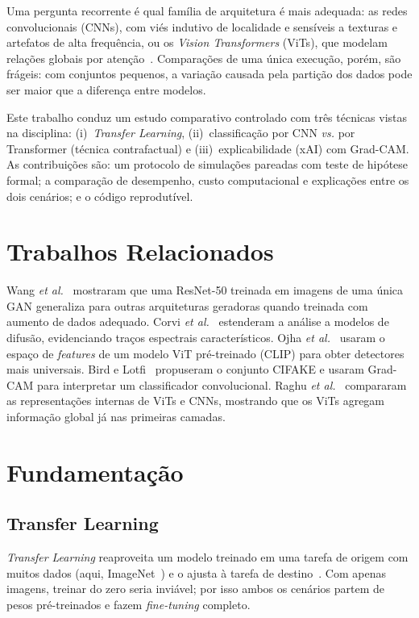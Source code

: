 \documentclass[conference]{IEEEtran}
\begin{document}
Uma pergunta recorrente é qual família de arquitetura é mais adequada: as redes
convolucionais (CNNs), com viés indutivo de localidade e sensíveis a texturas e
artefatos de alta frequência, ou os \emph{Vision Transformers} (ViTs), que modelam
relações globais por atenção~\cite{dosovitskiy2021vit,raghu2021vitcnn}. Comparações
de uma única execução, porém, são frágeis: com conjuntos pequenos, a variação causada
pela partição dos dados pode ser maior que a diferença entre modelos.

Este trabalho conduz um estudo comparativo controlado com três técnicas vistas na
disciplina: (i)~\emph{Transfer Learning}, (ii)~classificação por CNN \emph{vs.} por
Transformer (técnica contrafactual) e (iii)~explicabilidade (xAI) com Grad-CAM.
As contribuições são: um protocolo de \NSim{} simulações pareadas com teste de
hipótese formal; a comparação de desempenho, custo computacional e explicações
entre os dois cenários; e o código reprodutível.

\section{Trabalhos Relacionados}
Wang \emph{et al.}~\cite{wang2020cnnspot} mostraram que uma ResNet-50 treinada em
imagens de uma única GAN generaliza para outras arquiteturas geradoras quando
treinada com aumento de dados adequado. Corvi \emph{et al.}~\cite{corvi2023diffusion}
estenderam a análise a modelos de difusão, evidenciando traços espectrais
característicos. Ojha \emph{et al.}~\cite{ojha2023universal} usaram o espaço de
\emph{features} de um modelo ViT pré-treinado (CLIP) para obter detectores mais
universais. Bird e Lotfi~\cite{bird2024cifake} propuseram o conjunto CIFAKE e
usaram Grad-CAM para interpretar um classificador convolucional. Raghu \emph{et
al.}~\cite{raghu2021vitcnn} compararam as representações internas de ViTs e CNNs,
mostrando que os ViTs agregam informação global já nas primeiras camadas.

\section{Fundamentação}
\subsection{Transfer Learning}
\emph{Transfer Learning} reaproveita um modelo treinado em uma tarefa de origem
com muitos dados (aqui, ImageNet~\cite{deng2009imagenet}) e o ajusta à tarefa
de destino~\cite{pan2010survey}. Com apenas \NImages{} imagens, treinar do zero
seria inviável; por isso ambos os cenários partem de pesos pré-treinados e fazem
\emph{fine-tuning} completo.
\end{document}
